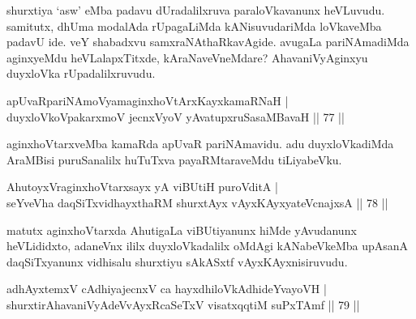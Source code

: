 \begin{artha}
shurxtiya `asw' eMba padavu dUradalilxruva paraloVkavanunx heVLuvudu. 
samitutx, dhUma modalAda rUpagaLiMda kANisuvudariMda loVkaveMba padavU 
ide. veY shabadxvu samxraNAthaRkavAgide. avugaLa pariNAmadiMda 
aginxyeMdu heVLalapxTitxde, kAraNaveVneMdare? AhavaniVyAginxyu 
duyxloVka rUpadalilxruvudu.
\end{artha}


\begin{shl}
apUvaRpariNAmoV\s yamaginxhoVtArxKayxkamaRNaH | \\
duyxloVkoVpakarxmoV jecnxVyoV yAvatupxruSasaMBavaH \hfill|| 77 || 
\end{shl}

\begin{artha}
aginxhoVtarxveMba kamaRda apUvaR pariNAmavidu. adu duyxloVkadiMda 
AraMBisi puruSanalilx huTuTxva payaRMtaraveMdu tiLiyabeVku.
\end{artha}


\begin{shl}
AhutoyxVraginxhoVtarxsayx yA viBUtiH puroVditA | \\
seYveVha daqSiTxvidhayxthaRM shurxtAyx vAyxKAyxyateV\s cnajxsA \hfill|| 78 || 
\end{shl}

\begin{artha}
matutx aginxhoVtarxda AhutigaLa viBUtiyanunx hiMde yAvudanunx heVLididxto, adaneVnx ililx duyxloVkadalilx oMdAgi kANabeVkeMba upAsanA daqSiTxyanunx vidhisalu shurxtiyu sAkASxtf vAyxKAyxnisiruvudu.
\end{artha}

\begin{shl}
adhAyxtemxV cAdhiyajecnxV ca hayxdhiloVkAdhideYvayoVH | \\
shurxtirAhavaniVyAdeVvAyxRcaSeTxV visatxqqtiM suPxTAmf \hfill|| 79 || 
\end{shl}

